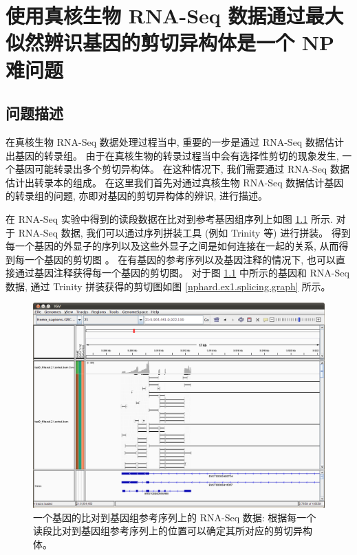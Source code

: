 \chapter{使用真核生物 RNA-Seq 数据通过最大似然辨识基因的剪切异构体是一个 NP 难问题}
\label{chap-rna-seq-nphard}

\section{问题描述}
在真核生物 RNA-Seq 数据处理过程当中, 重要的一步是通过 RNA-Seq 数据估计出基因的转录组。 
由于在真核生物的转录过程当中会有选择性剪切的现象发生, 一个基因可能转录出多个剪切异构体。 
在这种情况下, 我们需要通过 RNA-Seq 数据估计出转录本的组成。 
在这里我们首先对通过真核生物 RNA-Seq 数据估计基因的转录组的问题, 
亦即对基因的剪切异构体的辨识, 进行描述。 

在 RNA-Seq 实验中得到的读段数据在比对到参考基因组序列上如图 \ref{nphard.ex1.aligned.data} 所示. 
对于 RNA-Seq 数据, 
我们可以通过序列拼装工具 (例如 Trinity \cite{grabherr2011full} 等) 进行拼装。 
得到每一个基因的外显子的序列以及这些外显子之间是如何连接在一起的关系, 
从而得到每一个基因的剪切图 \cite{Heber01072002}。 
在有基因的参考序列以及基因注释的情况下, 也可以直接通过基因注释获得每一个基因的剪切图。 
对于图 \ref{nphard.ex1.aligned.data} 中所示的基因和 RNA-Seq 数据, 
通过 Trinity 拼装获得的剪切图如图 \ref{nphard.ex1.splicing.graph} 所示。 

\begin{figure}[!t]
\centering
\includegraphics[width=\textwidth]{figures/nphard/comp1.png}
\caption[一个基因的比对到基因组参考序列上的 RNA-Seq 数据]
{一个基因的比对到基因组参考序列上的 RNA-Seq 数据: 
根据每一个读段比对到基因组参考序列上的位置可以确定其所对应的剪切异构体。}
\label{nphard.ex1.aligned.data}
\end{figure}

